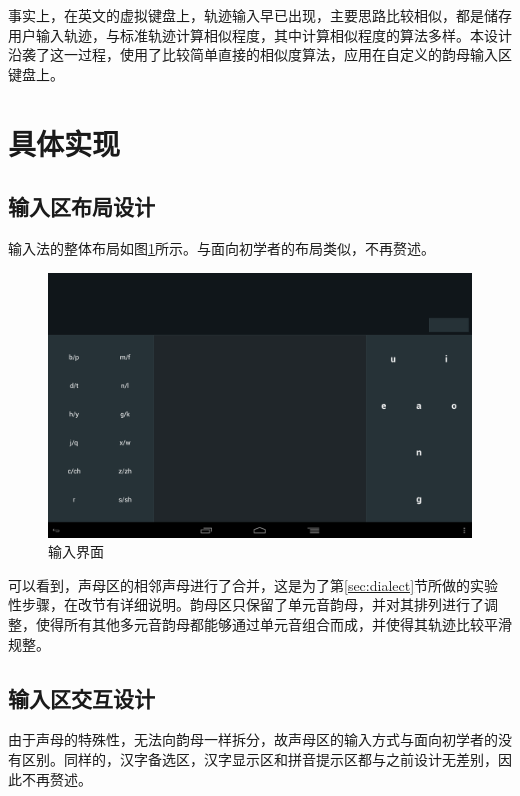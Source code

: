   事实上，在英文的虚拟键盘上，轨迹输入早已出现\supercite{kristenssondiscrete, hinckley2002input, zhai2008interlaced}，主要思路比较相似，都是储存用户输入轨迹，与标准轨迹计算相似程度，其中计算相似程度的算法多样。本设计沿袭了这一过程，使用了比较简单直接的相似度算法，应用在自定义的韵母输入区键盘上。

  \section{具体实现}
  \subsection{输入区布局设计}

  输入法的整体布局如图\ref{fig:layout2_background}所示。与面向初学者的布局类似，不再赘述。

  \begin{figure}[h]
  \noindent\includegraphics[width=150mm]{img/layout2_background}
  \caption{输入界面}
  \label{fig:layout2_background}
  \end{figure}

  可以看到，声母区的相邻声母进行了合并，这是为了第\ref{sec:dialect}节所做的实验性步骤，在改节有详细说明。韵母区只保留了单元音韵母，并对其排列进行了调整，使得所有其他多元音韵母都能够通过单元音组合而成，并使得其轨迹比较平滑规整。

  \subsection{输入区交互设计}

  由于声母的特殊性，无法向韵母一样拆分，故声母区的输入方式与面向初学者的没有区别。同样的，汉字备选区，汉字显示区和拼音提示区都与之前设计无差别，因此不再赘述。

